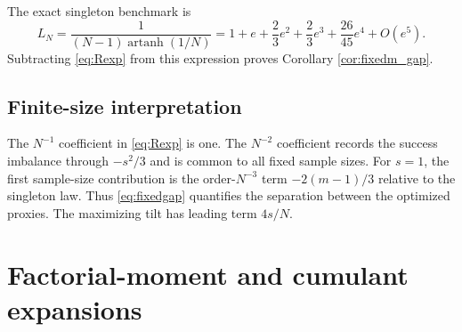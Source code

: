 \documentclass[11pt,a4paper]{article}
\begin{document}
The exact singleton benchmark is
\begin{equation}\label{eq:singletonL}
 L_N=\frac{1}{(N-1)\operatorname{artanh}(1/N)}
 =1+e+\frac23e^2+\frac23e^3+\frac{26}{45}e^4+O(e^5).
\end{equation}
Subtracting \eqref{eq:Rexp} from this expression proves Corollary \ref{cor:fixedm_gap}.

\subsection{Finite-size interpretation}
The $N^{-1}$ coefficient in \eqref{eq:Rexp} is one. The $N^{-2}$ coefficient records the success imbalance through $-s^2/3$ and is common to all fixed sample sizes. For $s=1$, the first sample-size contribution is the order-$N^{-3}$ term $-2(m-1)/3$ relative to the singleton law. Thus \eqref{eq:fixedgap} quantifies the separation between the optimized proxies. The maximizing tilt has leading term $4s/N$.



\section{Factorial-moment and cumulant expansions}\label{app:cumulants}
\end{document}
